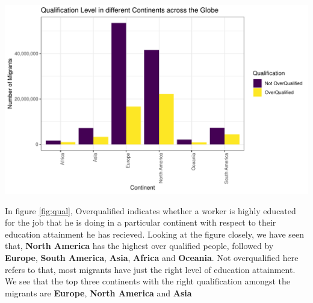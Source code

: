 \documentclass[11pt,a4paper,]{article}
\let\origfigure\figure
\let\endorigfigure\endfigure
\renewenvironment{figure}[1][2] {
    \expandafter\origfigure\expandafter[H]
} {
    \endorigfigure
}%
\begin{document}
\begin{figure}
\centering
\includegraphics{ETC5513assignment4_files/figure-latex/qual-1.pdf}
\caption{\label{fig:qual}Occupation Types}
\end{figure}

In figure \ref{fig:qual}, Overqualified indicates whether a worker is highly educated for the job that he is doing in a particular continent with respect to their education attainment he has recieved. Looking at the figure closely, we have seen that, \textbf{North America} has the highest over qualified people, followed by \textbf{Europe}, \textbf{South America}, \textbf{Asia}, \textbf{Africa} and \textbf{Oceania}. Not overqualified here refers to that, most migrants have just the right level of education attainment. We see that the top three continents with the right qualification amongst the migrants are \textbf{Europe}, \textbf{North America} and \textbf{Asia}
\end{document}
